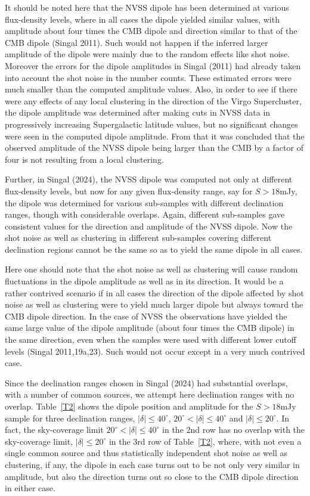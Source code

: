 \documentclass[fleqn,usenatbib]{mnras}
\begin{document}
It should be noted here that the NVSS dipole has been determined at various flux-density levels, where in all cases the dipole yielded similar values, with amplitude about four times the CMB dipole and direction similar to that of the CMB dipole (Singal 2011). Such would not happen if the inferred larger amplitude of the dipole were mainly due to the random effects like shot noise. Moreover the errors for the dipole amplitudes in Singal (2011) had already taken into account the shot noise in the number counts. These  estimated errors were much smaller than the computed amplitude values. Also, in order to see if there were any effects of any local clustering in the direction of the Virgo Supercluster, the dipole amplitude was determined after making cuts in NVSS data in progressively increasing Supergalactic latitude values, but no significant changes were seen in the computed dipole amplitude. From that it was concluded that the observed amplitude of the NVSS dipole being larger than the CMB by a factor of four is not resulting from a local clustering.

Further, in Singal (2024), the NVSS dipole was computed not only at different flux-density levels, but now for any  given flux-density range, say for $S>18$mJy, the dipole was determined for various sub-samples with different declination ranges, though with considerable overlaps. Again, different sub-samples gave  consistent values for the direction and amplitude of the NVSS dipole. Now the shot noise as well as  clustering in different sub-samples covering different declination regions cannot be the same so as to yield the same dipole in all cases. 

Here one should note that the shot noise as well as clustering will cause random fluctuations in the dipole amplitude as well as in its direction. It would be a rather contrived scenario if in all cases the direction of the dipole affected by shot noise as well as clustering were to yield much larger dipole but always toward the CMB dipole direction. In the case of NVSS the observations have yielded the same large value of the dipole amplitude (about four times the CMB dipole) in the same direction, even when the samples were used with different lower  cutoff levels (Singal 2011,19a,23). Such would not occur except in a very much contrived case. 

Since the declination ranges chosen in Singal (2024) had substantial overlaps, with a number of common sources, we attempt here declination ranges with no overlap. Table~\ref{T2} shows the dipole position and amplitude for the $S>18$mJy sample for three declination ranges, ${|\delta}|\leq 40^\circ$, $20^\circ<{|\delta}|\leq40^\circ$ and ${|\delta}|\leq 20^\circ$. 
In fact, the sky-coverage limit $20^\circ<{|\delta}|\leq40^\circ$ in the 2nd row has no overlap with the sky-coverage limit, ${|\delta}|\leq 20^\circ$ in the 3rd  row of Table~\ref{T2}, where, with not even a single common source and thus statistically independent shot noise as well as clustering, if any, the dipole in each case turns out to be not only very similar in amplitude, but also the  direction turns out so close to the CMB dipole direction in either case. 
\end{document}
